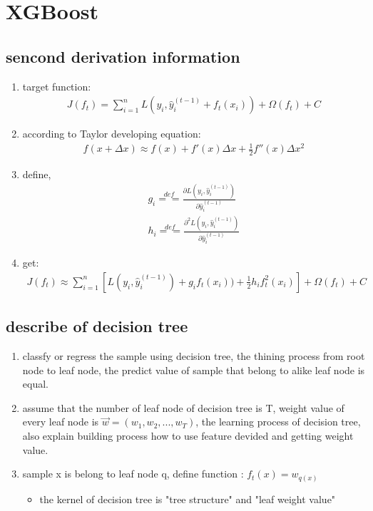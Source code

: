 \documentclass[12pt]{ctexart}%
\begin{document}
	\section{\quad XGBoost}
		\subsection{\quad sencond derivation information}
			\begin{enumerate}
				\item target function:
					\begin{align}
						J(f_t) = \sum_{i=1}^{n} L(y_i, \hat{y}_i^{(t-1)} + f_t(x_i)) + \Omega(f_t) + C
					\end{align}
					
				\item according to Taylor developing equation:
					\begin{align}
						f(x + \Delta x) \approx f(x) + f'(x)\Delta x + \frac{1}{2}f''(x)\Delta x^2
					\end{align}
					
				\item define,
					\begin{align}
						g_i \overset{def}{==} \frac{\partial L(y_i, \hat{y}_i^{(t-1)})}{\partial \hat{y}_i^{(t-1)}}\\
						h_i \overset{def}{==} \frac{\partial^2 L(y_i, \hat{y}_i^{(t-1)})}{\partial \hat{y}_i^{(t-1)}}
					\end{align}
				
				\item get:
					\begin{align}
						J(f_t) \approx \sum_{i=1}^{n} \left[ L(y_i, \hat{y}_i^{(t-1)}) + g_i f_t(x_i)) + \frac{1}{2} h_i f_t^2(x_i)\right] + \Omega(f_t) + C
					\end{align}
			\end{enumerate}
		
		\subsection{\quad describe of decision tree}
			\begin{enumerate}
				\item classfy or regress the sample using decision tree, the thining process from root node to leaf node, the predict value of sample that belong to alike leaf node is equal.
				
				\item assume that the number of leaf node of decision tree is T, weight value of every leaf node is $\vec{w} = (w_1, w_2, ..., w_T)$, the learning process of decision tree, also explain building process how to use feature devided and getting weight value.
				
				\item sample x is belong to leaf node q, define function : $f_t(x) = w_{q(x)}$
					\begin{itemize}
						\item the kernel of decision tree is "tree structure" and "leaf weight value"
					\end{itemize}
			\end{enumerate}	
		
\end{document}
